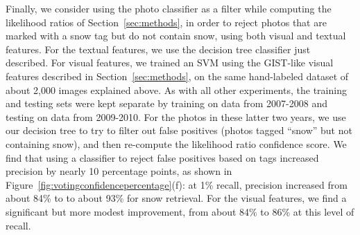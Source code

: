 
Finally, we consider using the photo classifier as a filter while
computing the likelihood ratios of Section~\ref{sec:methods}, in order
to reject photos that are marked with a snow tag but do not contain
snow, using both visual and textual features.  For the textual
features, we use the decision tree classifier just described.  For
visual features, we trained an SVM using the GIST-like visual features
described in Section~\ref{sec:methods}, on the same hand-labeled
dataset of about 2,000 images explained above.  As with all other
experiments, the training and testing sets were kept separate by
training on data from 2007-2008 and testing on data from 2009-2010.
For the photos in these latter two years, we use our decision tree to
try to filter out false positives (photos tagged ``snow'' but not
containing snow), and then re-compute the likelihood ratio confidence
score.  We find that using a classifier to reject
false positives based on tags increased precision by nearly 10 percentage points, as
shown in Figure~\ref{fig:votingconfidencepercentage}(f): at 1\%
recall, precision increased from about 84\% to to about 93\% for snow
retrieval. For the visual features, we find a significant but more modest improvement, from about 84\% to 86\% at this level of recall.
















